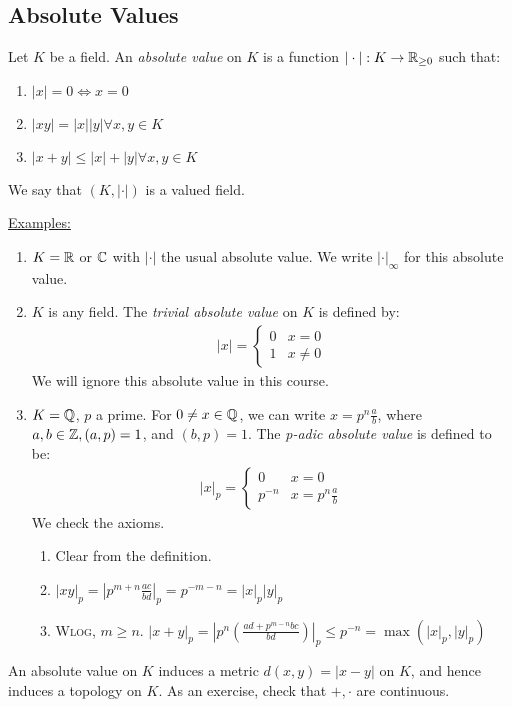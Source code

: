 \documentclass[10pt,a4paper]{article}
\begin{document}
\subsection{Absolute Values}
\begin{definition}
Let $K$ be a field. An \emph{absolute value} on $K$ is a function $|\cdot|:K \to \mathbb{R}_{\geq 0}$ such that:
\begin{enumerate}
  \item $|x| = 0 \iff x = 0$
  \item $|xy| = |x||y|\forall x, y \in K$
  \item $|x+y| \leq |x|+|y|\forall x, y \in K$
\end{enumerate}
We say that $(K, |\cdot|)$ is a valued field.
\end{definition}
\underline{Examples: }
\begin{enumerate}
  \item $K = \mathbb{R}$ or $\mathbb{C}$ with $|\cdot|$ the usual absolute value. We write $|\cdot|_\infty$ for this absolute value.
  \item $K$ is any field. The \emph{trivial absolute value} on $K$ is defined by:
  \begin{align}
    |x| = \begin{cases} 0 & x = 0 \\ 1 & x \neq 0 \end{cases}
  \end{align}
  We will ignore this absolute value in this course.
  \item $K = \mathbb{Q}$, $p$ a prime. For $0 \neq x \in \mathbb{Q}$, we can write $x = p^n \frac{a}{b}$, where $a, b \in \mathbb{Z}, (a, p) = 1$, and $(b, p) = 1$. The \emph{p-adic absolute value} is defined to be:
  \begin{align*}
    |x|_p = \begin{cases} 0 & x = 0 \\ p^{-n} & x = p^n\frac{a}{b} \end{cases}
  \end{align*}
  We check the axioms.
  \begin{enumerate}[label=\textit{\arabic*.}]
    \item Clear from the definition.
    \item $|xy|_p = |p^{m+n}\frac{ac}{bd}|_p = p^{-m-n} = |x|_p|y|_p$
    \item \textsc{Wlog}, $m\geq n$. $|x+y|_p = \left|p^n\left(\frac{ad+p^{m-n}bc}{bd}\right)\right|_p \leq p^{-n} = \max(|x|_p, |y|_p)$
  \end{enumerate}
\end{enumerate}
An absolute value on $K$ induces a metric $d(x,y) = |x-y|$ on $K$, and hence induces a topology on $K$. As an exercise, check that $+, \cdot$ are continuous.
\end{document}
